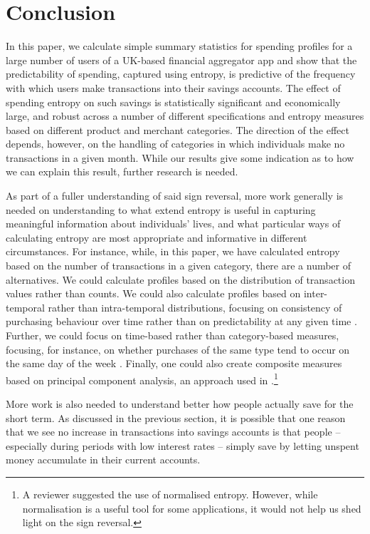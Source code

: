 
\section{Conclusion}
\label{sec:conclusion}

In this paper, we calculate simple summary statistics for spending profiles for
a large number of users of a UK-based financial aggregator app and show that
the predictability of spending, captured using entropy, is predictive of the
frequency with which users make transactions into their savings accounts. The
effect of spending entropy on {\color{blue} such} savings is statistically significant and
economically large, and robust across a number of different specifications and
entropy measures based on different product and merchant categories. The
direction of the effect depends, however, on the handling of categories in
which individuals make no transactions in a given month. While our results give
some indication as to how we can explain this result, further research is
needed.

As part of a fuller understanding of said sign reversal, more work generally is
needed on understanding to what extend entropy is useful in capturing
meaningful information about individuals' lives, and what particular ways of
calculating entropy are most appropriate and informative in different
circumstances. For instance, while, in this paper, we have calculated entropy
based on the number of transactions in a given category, there are a number of
alternatives. We could calculate profiles based on the distribution of
transaction values rather than counts. We could also calculate profiles based
on inter-temporal rather than intra-temporal distributions, focusing on
consistency of purchasing behaviour over time rather than on predictability at
any given time \citep{krumme2013predictability}. Further, we could focus on
time-based rather than category-based measures, focusing, for instance, on
whether purchases of the same type tend to occur on the same day of the week
\citep{guidotti2015behavioral}. Finally, one could also create composite
measures based on principal component analysis, an approach used in
\citet{eagle2010network}.\footnote{{\color{blue} A reviewer suggested the use of normalised entropy. However, while normalisation is a useful tool for some applications, it would not help us shed light on the sign reversal.}}

{\color{blue} More work is also needed to understand better how people actually save for the short term. As discussed in the previous section, it is possible that one reason that we see no increase in transactions into savings accounts is that people -- especially during periods with low interest rates -- simply save by letting unspent money accumulate in their current accounts.}

